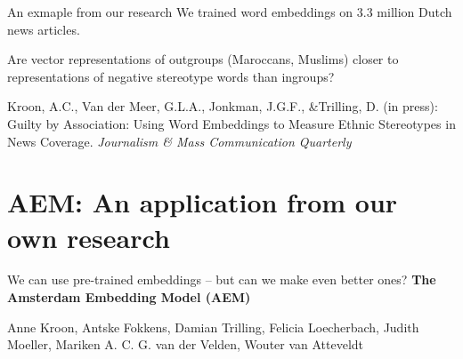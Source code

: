\documentclass[compress]{beamer}
\begin{document}
\begin{frame}{An exmaple from our research}
	We trained word embeddings on 3.3 million Dutch news articles.
	
	Are vector representations of outgroups (Maroccans, Muslims) closer to representations of negative stereotype words than ingroups?
	\vspace{.5cm}
	
	\tiny{Kroon, A.C., Van der Meer, G.L.A., Jonkman, J.G.F., \&Trilling, D. (in press): Guilty by Association: Using Word Embeddings to Measure Ethnic Stereotypes in News Coverage. \emph{Journalism \& Mass
			Communication Quarterly}}
\end{frame}


\begin{frame}[plain]
	
\end{frame}


\section[AEM]{AEM: An application from our own research}

\begin{frame}[plain]
	We can use pre-trained embeddings -- but can we make even better ones?
	\textbf{The Amsterdam Embedding Model (AEM)}\\
	
	
	\vspace{1cm}
	
	{\footnotesize{Anne Kroon, Antske Fokkens, Damian Trilling, Felicia Loecherbach, Judith Moeller, Mariken A. C. G. van der Velden, Wouter van Atteveldt} }
\end{frame}
\end{document}
